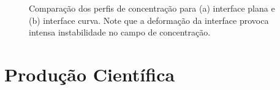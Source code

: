 \documentclass[a4paper,portuges,12pt]{article}
\begin{document}
 \begin{figure}[h]
 	\begin{center}
 		\hspace{0.7cm}
 	\end{center}
	\caption{Comparação dos perfis de concentração para (a) interface plana
	e (b) interface curva. Note que a deformação da interface provoca
	intensa instabilidade no campo de concentração.} 
	\label{fig:chem3} 
 \end{figure}

\clearpage

\section{Produção Científica}
\end{document}
